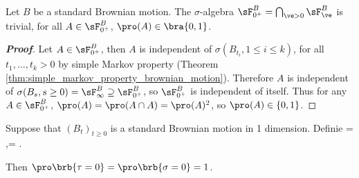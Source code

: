 \begin{theorem}\label{thm:blumenthal_zero_one_law}
Let $B$ be a standard Brownian motion. The $\sigma$-algebra $\sF^B_{0^+} = \bigcap_{\ve>0} \sF^B_\ve$ is trivial, for all
$A \in \sF^B_{0^+}$, $\pro(A) \in \bra{0, 1}$. %
\end{theorem}



\begin{proof}[\bf Proof]
Let $A \in \sF^B_{0^+}$, then $A$ is independent of $\sigma(B_{t_i} , 1 \leq i \leq k)$, for all $t_1, \dots , t_k > 0$ %
by simple Markov property (Theorem \ref{thm:simple_markov_property_brownian_motion}).
Therefore $A$ is independent of $\sigma(B_s, s \geq 0) = \sF^B_\infty \supseteq \sF^B_{0^+}$, so $\sF^B_{0^+}$ is independent of itself. Thus for any $A \in \sF^B_{0^+}$, $\pro(A) = \pro(A\cap A) = \pro(A)^2$, so $\pro(A) \in \{0, 1\}$.
\end{proof}

\begin{proposition}
Suppose that $(B_t)_{t\geq 0}$ is a standard Brownian motion in 1 dimension. Definie
\be
\tau = \inf{},\quad \quad \sigma = \inf{}.
\ee

Then $\pro\brb{\tau = 0} = \pro\brb{\sigma = 0} = 1$.
\end{proposition}

